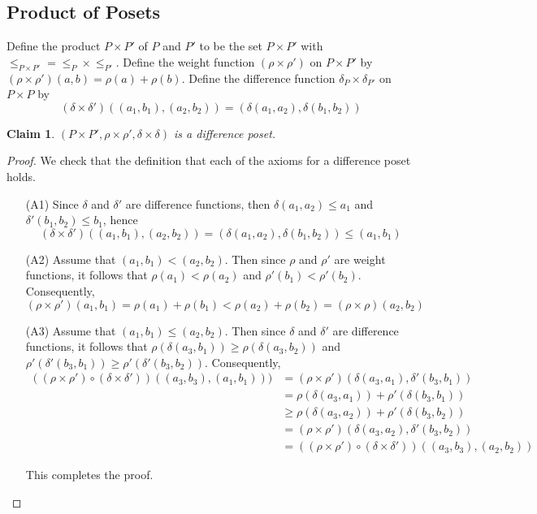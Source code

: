 \documentclass[acmsmall,review,anonymous]{acmart}\settopmatter{printfolios=true,printccs=false,printacmref=false}
\newtheorem{claim}{Claim}
\begin{document}
\subsection{Product of Posets}
Define the product $P \times P'$ of $P$ and $P'$ to be the set $P \times P'$
with $\leq_{P \times P'} = \leq_P \times \leq_{P'}$. Define the weight function
$(\rho \times \rho')$ on $P \times P'$ by $(\rho \times \rho')(a, b) = \rho(a)
+ \rho(b)$. Define the difference function $\delta_P \times \delta_{P'}$ on $P
\times P$ by $$(\delta \times \delta')((a_1, b_1), (a_2, b_2)) = (\delta(a_1,
a_2), \delta(b_1, b_2))$$
\begin{claim}
$(P \times P', \rho \times \rho', \delta \times \delta)$ is a difference poset.
\end{claim}
\begin{proof}
We check that the definition that each of the axioms for a difference poset
holds.
\begin{enumerate}
  \item[(A1)]
  Since $\delta$ and $\delta'$ are difference functions, then $\delta(a_1, a_2)
  \leq a_1$ and $\delta'(b_1, b_2) \leq b_1$, hence $$
  (\delta \times \delta')((a_1, b_1), (a_2, b_2)) = (\delta(a_1, a_2),
  \delta(b_1, b_2)) \leq (a_1, b_1)$$
  \item[(A2)]
  Assume that $(a_1, b_1) < (a_2, b_2)$. Then since $\rho$ and $\rho'$ are
  weight functions, it follows that $\rho(a_1) < \rho(a_2)$ and
  $\rho'(b_1) < \rho'(b_2)$. Consequently,
  $$(\rho \times \rho')(a_1, b_1) = \rho(a_1) + \rho(b_1) < \rho(a_2) +
  \rho(b_2) = (\rho \times \rho)(a_2, b_2)$$
  \item[(A3)]
  Assume that $(a_1, b_1) \leq (a_2, b_2)$. Then since $\delta$ and $\delta'$ are
  difference functions, it follows that $\rho(\delta(a_3, b_1))
  \geq \rho(\delta(a_3, b_2))$ and $\rho'(\delta'(b_3, b_1)) \geq
  \rho'(\delta'(b_3, b_2))$.
  Consequently,
  \begin{align*}
((\rho \times \rho') \circ (\delta \times \delta'))((a_3, b_3), (a_1, b_1)))
&= (\rho \times \rho')(\delta(a_3, a_1), \delta'(b_3, b_1))\\
&= \rho(\delta(a_3, a_1)) + \rho'(\delta(b_3, b_1))\\
&\geq \rho(\delta(a_3, a_2)) + \rho'(\delta(b_3, b_2))\\
&= (\rho \times \rho')(\delta(a_3, a_2), \delta'(b_3, b_2))\\
&= ((\rho \times \rho') \circ (\delta \times \delta'))((a_3, b_3), (a_2,
b_2))\end{align*}

This completes the proof.
\end{enumerate}
\end{proof}
\end{document}
